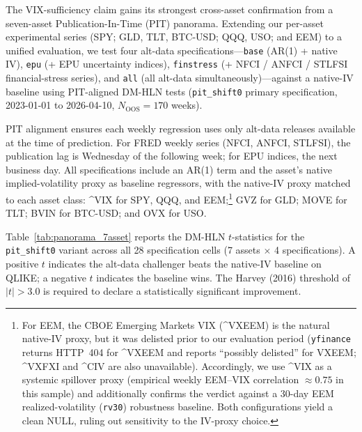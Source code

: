 \documentclass[12pt,a4paper]{article}
\begin{document}
The VIX-sufficiency claim gains its strongest cross-asset confirmation from a seven-asset Publication-In-Time (PIT) panorama. Extending our per-asset experimental series (SPY; GLD, TLT, BTC-USD; QQQ, USO; and EEM) to a unified evaluation, we test four alt-data specifications---\texttt{base} (AR(1) + native IV), \texttt{epu} (+ EPU uncertainty indices), \texttt{finstress} (+ NFCI / ANFCI / STLFSI financial-stress series), and \texttt{all} (all alt-data simultaneously)---against a native-IV baseline using PIT-aligned DM-HLN tests (\texttt{pit\_shift0} primary specification, 2023-01-01 to 2026-04-10, $N_{\text{OOS}} = 170$ weeks).

PIT alignment ensures each weekly regression uses only alt-data releases available at the time of prediction. For FRED weekly series (NFCI, ANFCI, STLFSI), the publication lag is Wednesday of the following week; for EPU indices, the next business day. All specifications include an AR(1) term and the asset's native implied-volatility proxy as baseline regressors, with the native-IV proxy matched to each asset class: \^{}VIX for SPY, QQQ, and EEM;\footnote{For EEM, the CBOE Emerging Markets VIX (\^{}VXEEM) is the natural native-IV proxy, but it was delisted prior to our evaluation period (\texttt{yfinance} returns HTTP~404 for \^{}VXEEM and reports ``possibly delisted'' for VXEEM; \^{}VXFXI and \^{}CIV are also unavailable). Accordingly, we use \^{}VIX as a systemic spillover proxy (empirical weekly EEM--VIX correlation $\approx 0.75$ in this sample) and additionally confirms the verdict against a 30-day EEM realized-volatility (\texttt{rv30}) robustness baseline. Both configurations yield a clean NULL, ruling out sensitivity to the IV-proxy choice.} GVZ for GLD; MOVE for TLT; BVIN for BTC-USD; and OVX for USO.

Table~\ref{tab:panorama_7asset} reports the DM-HLN $t$-statistics for the \texttt{pit\_shift0} variant across all 28 specification cells (7 assets $\times$ 4 specifications). A positive $t$ indicates the alt-data challenger beats the native-IV baseline on QLIKE; a negative $t$ indicates the baseline wins. The Harvey (2016) threshold of $|t| > 3.0$ is required to declare a statistically significant improvement.
\end{document}
